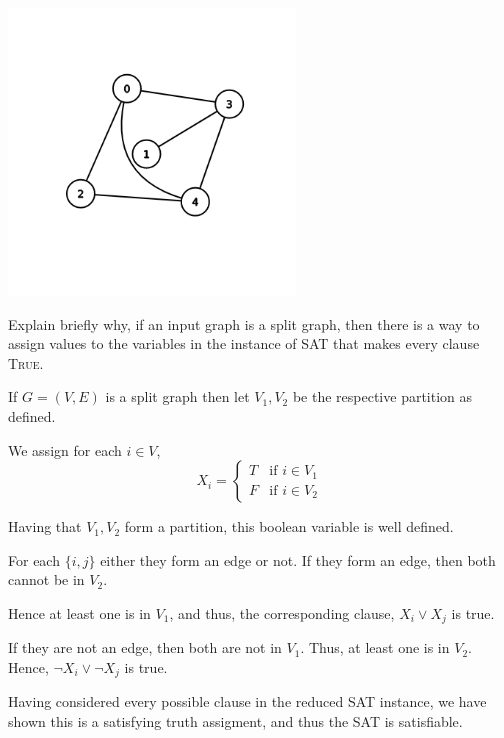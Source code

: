 \begin{questions}
	\centerline{\includegraphics[width=3in]{graph1.png}}

	\ifsolutions\fi

	\question[3] Explain briefly why, if  an input graph is a split graph, then  there is a way to
	assign  values  to  the variables  in  the  instance  of  SAT that  makes  every  clause
	\textsc{True}.

	\begin{soln}
		If \(G = (V, E)\) is a split graph then let \(V_1, V_2\) be the respective partition as defined.

		We assign for each \(i \in V\),
		\[
			X_i =
			\begin{cases}
				T & \text{if } i \in V_1 \\
				F & \text{if } i \in V_2
			\end{cases}
		\]

		Having that \(V_1, V_2\) form a partition, this boolean variable is well defined.

		For each \(\{i, j\}\) either they form an edge or not. If they form an edge, then both cannot be in \(V_2\).

		Hence at least one is in \(V_1\), and thus, the corresponding clause, \(X_i \lor X_j\) is true.

		If they are not an edge, then both are not in \(V_1\). Thus, at least one is in \(V_2\). Hence, \(\lnot X_i \lor \lnot X_j\) is true.

		Having considered every possible clause in the reduced SAT instance, we have shown this is a satisfying truth assigment, and thus the SAT is satisfiable.

	\end{soln}

	\ifsolutions\fi


\end{questions}
